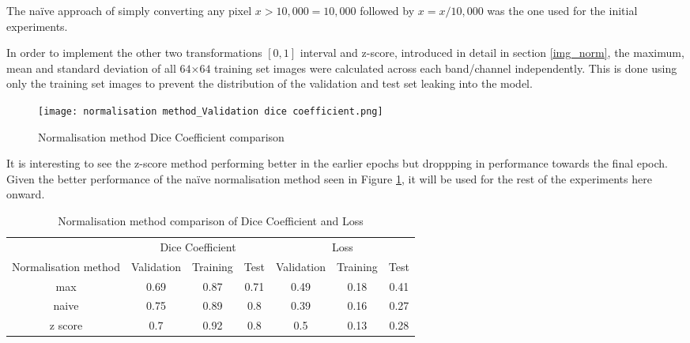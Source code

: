 The na\"ive approach of simply converting any pixel $x>10,000=10,000$ followed by $x=x/10,000$ was the one used for the initial experiments.

In order to implement the other two transformations $[0,1]$ interval and z-score, introduced in detail in section \ref{img_norm}, the maximum, mean and standard deviation of all $64$×$64$ training set images were calculated across each band/channel independently. This is done using only the training set images to prevent the distribution of the validation and test set leaking into the model.

\begin{figure}[hbt!]
    \centering
    \texttt{[image: normalisation method\_Validation dice coefficient.png]}
    \caption{Normalisation method Dice Coefficient comparison}
    \label{norm_dice}
\end{figure}

It is interesting to see the z-score method performing better in the earlier epochs but droppping in performance towards the final epoch. Given the better performance of the na\"ive normalisation method seen in Figure \ref{norm_dice}, it will be used for the rest of the experiments here onward.
\begin{table}[ht!] 
    \begin{center}
    \begin{tabular}{ccccccc} 
    \toprule
       & \multicolumn{3}{c}{Dice Coefficient}     & \multicolumn{3}{c}{Loss} \\
    Normalisation method & Validation & Training & Test & Validation & Training & Test \\ \midrule
    max & 0.69 & 0.87 & 0.71 & 0.49 & 0.18 & 0.41  \\ \rowcolor{lightgray} naive & 0.75 & 0.89 & 0.8 & 0.39 & 0.16 & 0.27  \\ z score & 0.7 & 0.92 & 0.8 & 0.5 & 0.13 & 0.28  \\
    \bottomrule
    \end{tabular}
  \end{center} 
  \caption{Normalisation method comparison of Dice Coefficient and Loss}\label{tab_norm}
\end{table}
